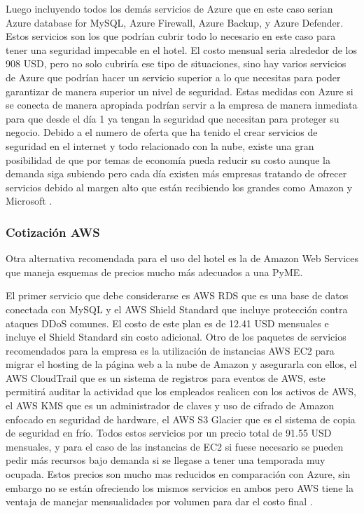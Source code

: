 \documentclass[10pt]{article}
\begin{document}
Luego incluyendo todos los demás servicios de Azure que en este caso serian Azure database for MySQL, Azure Firewall, Azure Backup, y Azure Defender. Estos servicios son los que podrían cubrir todo lo necesario en este caso para tener una seguridad impecable en el hotel. El costo mensual seria alrededor de los 908 USD, pero no solo cubriría ese tipo de situaciones, sino hay varios servicios de Azure que podrían hacer un servicio superior a lo que necesitas para poder garantizar de manera superior un nivel de seguridad. Estas medidas con Azure si se conecta de manera apropiada podrían servir a la empresa de manera inmediata para que desde el día 1 ya tengan la seguridad que necesitan para proteger su negocio. Debido a el numero de oferta que ha tenido el crear servicios de seguridad en el internet y todo relacionado con la nube, existe una gran posibilidad de que por temas de economía pueda reducir su costo aunque la demanda siga subiendo pero cada día existen más empresas tratando de ofrecer servicios debido al margen alto que están recibiendo los grandes como Amazon y Microsoft \cite{ref10}. 



\subsubsection{Cotización AWS}

Otra alternativa recomendada para el uso del hotel es la de Amazon Web Services que maneja esquemas de precios mucho más adecuados a una PyME. 

El primer servicio que debe considerarse es AWS RDS que es una base de datos conectada con MySQL y el AWS Shield Standard que incluye protección contra ataques DDoS comunes. El costo de este plan es de 12.41 USD mensuales e incluye el Shield Standard sin costo adicional. Otro de los paquetes de servicios recomendados para la empresa es la utilización de instancias AWS EC2 para migrar el hosting de la página web a la nube de Amazon y asegurarla con ellos, el AWS CloudTrail que es un sistema de registros para eventos de AWS, este permitirá auditar la actividad que los empleados realicen con los activos de AWS, el AWS KMS que es un administrador de claves y uso de cifrado de Amazon enfocado en seguridad de hardware, el AWS S3 Glacier que es el sistema de copia de seguridad en frío. Todos estos servicios por un precio total de 91.55 USD mensuales, y para el caso de las instancias de EC2 si fuese necesario se pueden pedir más recursos bajo demanda si se llegase a tener una temporada muy ocupada. Estos precios son mucho mas reducidos en comparación con Azure, sin embargo no se están ofreciendo los mismos servicios en ambos pero AWS tiene la ventaja de manejar mensualidades por volumen para dar el costo final \cite{ref12}.
\end{document}
